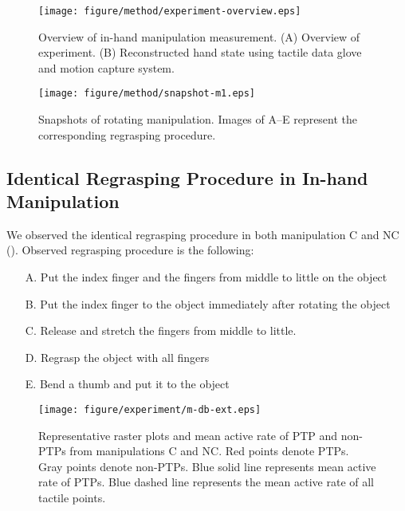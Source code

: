 \documentclass[letterpaper, 10 pt, conference]{IEEEtran}  %
\begin{document}
\begin{figure}[t!]
  \centering
  \texttt{[image: figure/method/experiment-overview.eps]}
  \caption{Overview of in-hand manipulation measurement. (A) Overview of experiment. (B) Reconstructed hand state using tactile data glove and motion capture system.}
 \label{fig:experiment-overview}
\end{figure}

\begin{figure*}[t!]
  \centering
  \texttt{[image: figure/method/snapshot-m1.eps]}
 \caption{Snapshots of rotating manipulation. Images of A--E represent the corresponding regrasping procedure.}
 \label{fig:snapshot}
\end{figure*}



\subsection{Identical Regrasping Procedure in In-hand Manipulation}

We observed the identical regrasping procedure in both manipulation C and NC (). Observed regrasping procedure is the following:
\begin{itemize}
    \item[A.] Put the index finger and the fingers from middle to little on the object
    \item[B.] Put the index finger to the object immediately after rotating the object
    \item[C.] Release and stretch the fingers from middle to little.
    \item[D.] Regrasp the object with all fingers
    \item[E.] Bend a thumb and put it to the object
\end{itemize}

\begin{figure*}[t!]
 \centering
  \texttt{[image: figure/experiment/m-db-ext.eps]}
  \caption{Representative raster plots and mean active rate of PTP and non-PTPs from manipulations C and NC. Red points denote PTPs. Gray points denote non-PTPs. Blue solid line represents mean active rate of PTPs. Blue dashed line represents the mean active rate of all tactile points.}
 \label{fig:m-db-ext}
\end{figure*}
\end{document}
